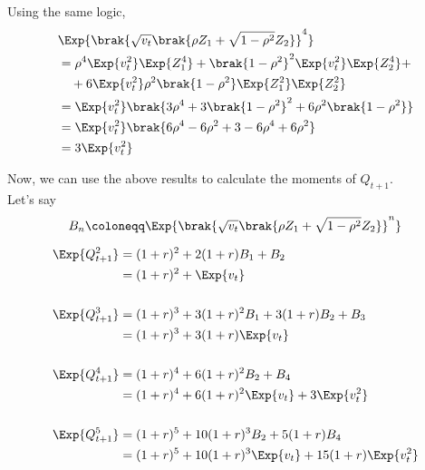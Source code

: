 Using the same logic,
\begin{align*}
	&\Exp{\brak{\sqrt{v_t}\brak{\rho Z_1 + \sqrt{1 - \rho^2} Z_2}}^4} \\
	& = \rho^4 \Exp{v_t^2} \Exp{Z_1^4} + \brak{1 - \rho^2}^2
		\Exp{v_t^2} \Exp{Z_2^4} + \\
	& \quad + 6\Exp{v_t^2} \rho^2 \brak{1 - \rho^2} \Exp{Z_1^2} \Exp{Z_2^2} \\
	&= \Exp{v_t^2} \brak{3\rho^4 + 3\brak{1 - \rho^2}^2
		+ 6\rho^2\brak{1-\rho^2}} \\
	&= \Exp{v_t^2} \brak{6\rho^4 - 6\rho^2 + 3 - 6\rho^4 + 6\rho^2} \\
	&= 3\Exp{v_t^2}
\end{align*}

Now, we can use the above results to calculate the moments of \( Q_{t+1} \). \\
Let's say
\[
	B_n \coloneqq\Exp{\brak{\sqrt{v_t}\brak{\rho Z_1 +
	\sqrt{1 - \rho^2} Z_2}}^n}
\]

\begin{align*}
	\Exp{Q_{t+1}^2} &= (1+r)^2 + 2(1+r)B_1 + B_2 \\
	&= (1+r)^2 + \Exp{v_t} \\
	\\
	\Exp{Q_{t+1}^3} &= (1+r)^3 + 3(1+r)^2 B_1 + 3(1+r)B_2 + B_3 \\
	&= (1+r)^3 + 3(1+r)\Exp{v_t} \\
	\\
	\Exp{Q_{t+1}^4} &= (1+r)^4 + 6(1+r)^2 B_2 + B_4 \\
	&= (1+r)^4 + 6(1+r)^2 \Exp{v_t} + 3\Exp{v_t^2} \\
	\\
	\Exp{Q_{t+1}^5} &= (1+r)^5 + 10(1+r)^3 B_2 + 5(1+r)B_4 \\
	&= (1+r)^5 + 10(1+r)^3 \Exp{v_t} + 15(1+r)\Exp{v_t^2} \\
\end{align*}